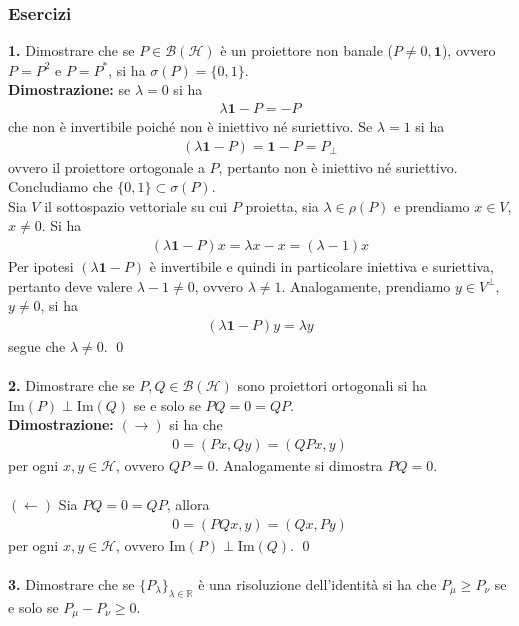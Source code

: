 \documentclass{article}
\numberwithin{equation}{subsection}
\begin{document}
\subsubsection{Esercizi}
\textbf{1.} Dimostrare che se $P \in \mathcal{B}(\mathcal{H})$ è un proiettore non banale ($P \neq 0, \mathbf{1}$), ovvero $P = P^2$ e $P = P^*$, si ha $\sigma(P) = \{0, 1\}$. \\

\textbf{Dimostrazione:} se $\lambda = 0$ si ha 
\begin{align*}
    \lambda\mathbf{1} - P = -P 
\end{align*}
che non è invertibile poiché non è iniettivo né suriettivo. Se $\lambda = 1$ si ha 
\begin{align*}
    (\lambda\mathbf{1} - P) = \mathbf{1} - P = P_{\perp} 
\end{align*}
ovvero il proiettore ortogonale a $P$, pertanto non è iniettivo né suriettivo. Concludiamo che $\{0, 1\} \subset \sigma(P)$. \\
Sia $V$ il sottospazio vettoriale su cui $P$ proietta, sia $\lambda \in \rho(P)$ e prendiamo $x \in V$, $x \neq 0$. Si ha 
\begin{align*}
    (\lambda\mathbf{1} - P)x = \lambda x - x = (\lambda - 1)x 
\end{align*}
Per ipotesi $(\lambda\mathbf{1} - P)$ è invertibile e quindi in particolare iniettiva e suriettiva, pertanto deve valere $\lambda - 1 \neq 0$, ovvero $\lambda \neq 1$. Analogamente, prendiamo $y \in V^\perp$, $y \neq 0$, si ha 
\begin{align*}
    (\lambda\mathbf{1} - P)y = \lambda y 
\end{align*}
segue che $\lambda \neq 0$. \qed \\ \\
\textbf{2.} Dimostrare che se $P, Q \in \mathcal{B}(\mathcal{H})$ sono proiettori ortogonali si ha $\mathrm{Im}(P) \perp \mathrm{Im}(Q)$ se e solo se $PQ = 0 = QP$. \\

\textbf{Dimostrazione:} $(\rightarrow)$ si ha che 
\begin{align*}
    0 = (Px, Qy) = (QPx, y) 
\end{align*}
per ogni $x, y \in \mathcal{H}$, ovvero $QP = 0$. Analogamente si dimostra $PQ = 0$. \\ \\
$(\leftarrow)$ Sia $PQ = 0 = QP$, allora 
\begin{align*}
    0 = (PQx, y) = (Qx, Py) 
\end{align*}
per ogni $x, y \in \mathcal{H}$, ovvero $\mathrm{Im}(P) \perp \mathrm{Im}(Q)$. \qed \\ \\
\textbf{3.} Dimostrare che se $\{P_\lambda\}_{\lambda \in \mathbb{R}}$ è una risoluzione dell'identità si ha che $P_\mu \geq P_\nu$ se e solo se $P_\mu - P_\nu \geq 0$. \\
\end{document}
